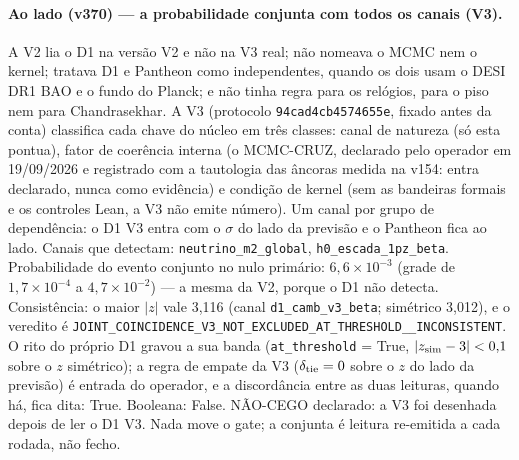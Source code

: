 \documentclass[11pt]{article}
\theoremstyle{definition}\newtheorem{deriv}{Derivação}
\begin{document}
\paragraph*{Ao lado (v370) --- a probabilidade conjunta com todos os canais (V3).} A V2 lia o D1 na versão V2 e não na V3 real; não nomeava o MCMC nem o kernel; tratava D1 e Pantheon como independentes, quando os dois usam o DESI DR1 BAO e o fundo do Planck; e não tinha regra para os relógios, para o piso nem para Chandrasekhar. A V3 (protocolo \texttt{94cad4cb4574655e}, fixado antes da conta) classifica cada chave do núcleo em três classes: canal de natureza (só esta pontua), fator de coerência interna (o MCMC-CRUZ, declarado pelo operador em 19/09/2026 e registrado com a tautologia das âncoras medida na v154: entra declarado, nunca como evidência) e condição de kernel (sem as bandeiras formais e os controles Lean, a V3 não emite número). Um canal por grupo de dependência: o D1 V3 entra com o $\sigma$ do lado da previsão e o Pantheon fica ao lado. Canais que detectam: \texttt{neutrino\_m2\_global}, \texttt{h0\_escada\_1pz\_beta}. Probabilidade do evento conjunto no nulo primário: $6,6\times10^{-3}$ (grade de $1,7\times10^{-4}$ a $4,7\times10^{-2}$) --- a mesma da V2, porque o D1 não detecta. Consistência: o maior $|z|$ vale 3,116 (canal \texttt{d1\_camb\_v3\_beta}; simétrico 3,012), e o veredito é \texttt{JOINT\_COINCIDENCE\_V3\_NOT\_EXCLUDED\_AT\_THRESHOLD\_\_INCONSISTENT}. O rito do próprio D1 gravou a sua banda (\texttt{at\_threshold} = True, $|z_{\rm sim}-3|<0{,}1$ sobre o $z$ simétrico); a regra de empate da V3 ($\delta_{\rm tie}=0$ sobre o $z$ do lado da previsão) é entrada do operador, e a discordância entre as duas leituras, quando há, fica dita: True. Booleana: False. NÃO-CEGO declarado: a V3 foi desenhada depois de ler o D1 V3. Nada move o gate; a conjunta é leitura re-emitida a cada rodada, não fecho.
\end{document}
